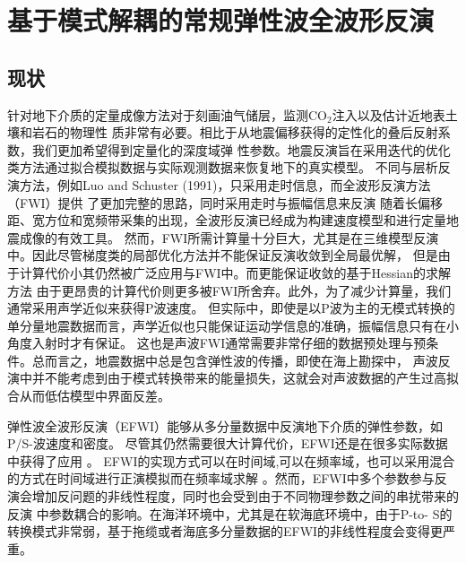 



\chapter{基于模式解耦的常规弹性波全波形反演}
\label{cha:intro}
\section{现状}
针对地下介质的定量成像方法对于刻画油气储层，监测CO$_2$注入以及估计近地表土壤和岩石的物理性
质非常有必要。相比于从地震偏移获得的定性化的叠后反射系数，我们更加希望得到定量化的深度域弹
性参数。地震反演旨在采用迭代的优化类方法通过拟合模拟数据与实际观测数据来恢复地下的真实模型。
不同与层析反演方法，例如Luo and Schuster (1991)\citep{luo1991}，只采用走时信息，而全波形反演方法（FWI）提供
了更加完整的思路，同时采用走时与振幅信息来反演\cite[]{tarantola:1986}
随着长偏移距、宽方位和宽频带采集的出现，全波形反演已经成为构建速度模型和进行定量地震成像的有效工具\cite{virieux2009overview}。
然而，FWI所需计算量十分巨大，尤其是在三维模型反演中。因此尽管梯度类的局部优化方法并不能保证反演收敛到全局最优解，
但是由于计算代价小其仍然被广泛应用与FWI中。而更能保证收敛的基于Hessian的求解方法\cite{mora:1987,crase1990robust}
由于更昂贵的计算代价则更多被FWI所舍弃。此外，为了减少计算量，我们通常采用声学近似来获得P波速度\cite{ravaut2004multiscale,operto2006crustal}。
但实际中，即使是以P波为主的无模式转换的单分量地震数据而言，声学近似也只能保证运动学信息的准确，振幅信息只有在小角度入射时才有保证。
这也是声波FWI通常需要非常仔细的数据预处理与预条件。总而言之，地震数据中总是包含弹性波的传播，即使在海上勘探中，
声波反演中并不能考虑到由于模式转换带来的能量损失，这就会对声波数据的产生过高拟合从而低估模型中界面反差。

弹性波全波形反演（EFWI）\cite{tarantola:1986}能够从多分量数据中反演地下介质的弹性参数，如P/S-波速度和密度。
尽管其仍然需要很大计算代价，EFWI还是在很多实际数据中获得了应用
\cite{crase1992nonlinear,djikpesse.tarantola:1999,sears:2008,sears:2010,prieux:2013a,prieux:2013b,vigh:2014}。
EFWI的实现方式可以在时间域\cite{shipp:2002},可以在频率域\cite{brossier2009}，也可以采用混合的方式在时间域进行正演模拟而在频率域求解
\cite{nihei.li:2007,sirgue:2008}。然而，EFWI中多个参数参与反演会增加反问题的非线性程度，同时也会受到由于不同物理参数之间的串扰带来的反演
中参数耦合的影响\cite{forgues.lambare:1997}。在海洋环境中，尤其是在软海底环境中，由于P-to-
S的转换模式非常弱，基于拖缆或者海底多分量数据的EFWI的非线性程度会变得更严重\cite{sears:2008}。

